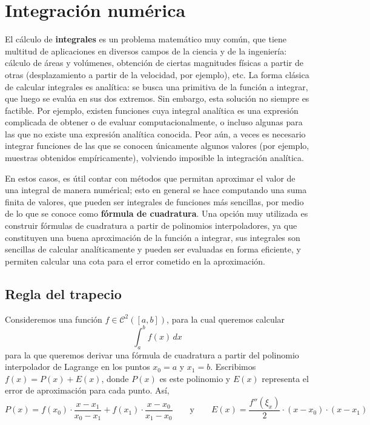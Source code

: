 
\section{Integración numérica}
\label{section:integracion}

El cálculo de \textbf{integrales} es un problema matemático muy común, que
tiene multitud de aplicaciones en diversos campos de la ciencia y de la
ingeniería: cálculo de áreas y volúmenes, obtención de ciertas magnitudes
físicas a partir de otras (desplazamiento a partir de la velocidad, por
ejemplo), etc. La forma clásica de calcular integrales es analítica: se busca
una primitiva de la función a integrar, que luego se evalúa en sus dos
extremos. Sin embargo, esta solución no siempre es factible. Por ejemplo,
existen funciones cuya integral analítica es una expresión complicada de
obtener o de evaluar computacionalmente, o incluso algunas para las que no
existe una expresión analítica conocida. Peor aún, a veces es necesario
integrar funciones de las que se conocen únicamente algunos valores (por
ejemplo, muestras obtenidos empíricamente), volviendo imposible la integración
analítica.

En estos casos, es útil contar con métodos que permitan aproximar el valor de
una integral de manera numérical; esto en general se hace computando una suma
finita de valores, que pueden ser integrales de funciones más sencillas, por
medio de lo que se conoce como \textbf{fórmula de cuadratura}. Una opción muy
utilizada es construir fórmulas de cuadratura a partir de polinomios
interpoladores, ya que constituyen una buena aproximación de la función a
integrar, sus integrales son sencillas de calcular analíticamente y pueden
ser evaluadas en forma eficiente, y permiten calcular una cota para el
error cometido en la aproximación.

\subsection{Regla del trapecio}

Consideremos una función $f \in \mathcal{C}^2([a,b])$, para la cual queremos
calcular
\[ \int_a^b f(x) \,dx \]
para la que queremos derivar una fórmula de cuadratura a partir del polinomio
interpolador de Lagrange en los puntos $x_0 = a$ y $x_1 = b$. Escribimos $f(x)
= P(x) + E(x)$, donde $P(x)$ es este polinomio y $E(x)$ representa el error de
aproximación para cada punto. Así,
\[ P(x) =  f(x_0) \cdot \frac{x - x_1}{x_0 - x_1}
    + f(x_1) \cdot \frac{x - x_0}{x_1 - x_0}
    \qquad \text{y} \qquad
    E(x) = \frac{f''(\xi_x)}{2} \cdot (x-x_0) \cdot (x-x_1) \]

